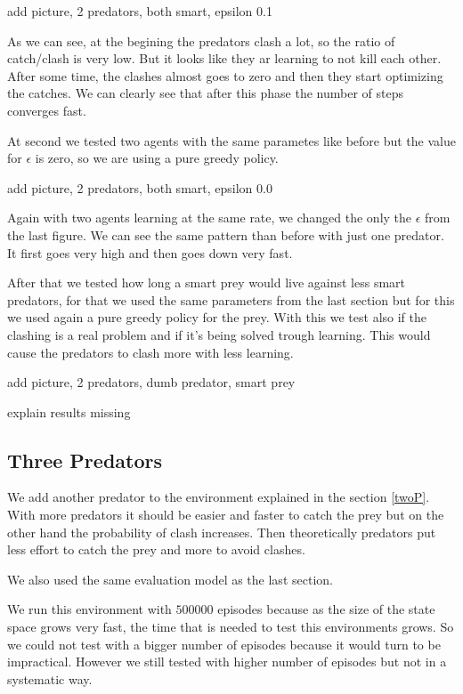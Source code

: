 \documentclass{article}
\begin{document}
\error add picture, 2 predators, both smart, epsilon 0.1

As we can see, at the begining the predators clash a lot, so the ratio of
catch/clash is very low. But it looks like they ar learning to not kill each
other. After some time, the clashes almost goes to zero and then they start
optimizing the catches. We can clearly see that after this phase the number of
steps converges fast.


At second we tested two agents with the same parametes like before but the value
for $\epsilon$ is zero, so we are using a pure greedy policy.

\error add picture, 2 predators, both smart, epsilon 0.0

Again with two agents learning at the same rate, we changed the only the
$\epsilon$ from the last figure. We can see the same pattern than before with
just one predator. It first goes very high and then goes down very fast.

After that we tested how long a smart prey would live against less smart
predators, for that we used the same parameters from the last section but for
this we used again a pure greedy policy for the prey.
With this we test also if the clashing is a real problem and if it's being solved
trough learning. This would cause the predators to clash more with less
learning. 

\error add picture, 2 predators, dumb predator, smart prey

\error explain results missing


\subsection{Three Predators}
We add another predator to the environment explained in the section \ref{twoP}.
With more predators it should be easier and faster to catch the prey but on the
other hand the probability of clash increases. Then theoretically predators put
less effort to catch the prey and more to avoid clashes.

We also used the same evaluation model as the last section.

We run this environment with $500000$ episodes because as the size of the state
space grows very fast, the time that is needed to test this environments grows.
So we could not test with a bigger number of episodes because it would turn to
be impractical. However we still tested with higher number of episodes but not
in a systematic way.
\end{document}
